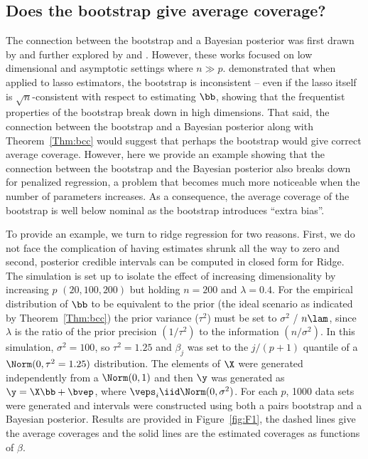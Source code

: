 \subsection{Does the bootstrap give average coverage?}
\label{Sec:boot-bias}

The connection between the bootstrap and a Bayesian posterior was first drawn by \cite{Rubin1981} and further explored by \cite{efron1982} and \cite{Lo1987}. However, these works focused on low dimensional and asymptotic settings where $n \gg p$. \cite{Chatterjee2010} demonstrated that when applied to lasso estimators, the bootstrap is inconsistent -- even if the lasso itself is $\sqrt{n}$-consistent with respect to estimating $\bb$, showing that the frequentist properties of the bootstrap break down in high dimensions. That said, the connection between the bootstrap and a Bayesian posterior along with Theorem~\ref{Thm:bcc} would suggest that perhaps the bootstrap would give correct average coverage. However, here we provide an example showing that the connection between the bootstrap and the Bayesian posterior also breaks down for penalized regression, a problem that becomes much more noticeable when the number of parameters increases. As a consequence, the average coverage of the bootstrap is well below nominal as the bootstrap introduces ``extra bias''.

To provide an example, we turn to ridge regression for two reasons. First, we do not face the complication of having estimates shrunk all the way to zero and second, posterior credible intervals can be computed in closed form for Ridge. The simulation is set up to isolate the effect of increasing dimensionality by increasing $p$ $(20, 100, 200)$ but holding $n = 200$ and $\lambda = 0.4$. For the empirical distribution of $\bb$ to be equivalent to the prior (the ideal scenario as indicated by Theorem~\ref{Thm:bcc}) the prior variance ($\tau^2$) must be set to $\sigma^2$ / $n\lam$, since $\lambda$ is the ratio of the prior precision $(1/\tau^2)$ to the information $(n / \sigma^2)$. In this simulation, $\sigma^2 = 100$, so $\tau^2 = 1.25$ and $\beta_j$ was set to the $j/(p+1)$ quantile of a $\Norm(0,\tau^2=1.25)$ distribution. The elements of $\X$ were generated independently from a $\Norm(0, 1)$ and then $\y$ was generated as $\y = \X\bb + \bvep$, where $\veps_i \iid \Norm(0, \sigma^2)$. For each $p$, 1000 data sets were generated and intervals were constructed using both a pairs bootstrap and a Bayesian posterior. Results are provided in Figure~\ref{fig:F1}, the dashed lines give the average coverages and the solid lines are the estimated coverages as functions of $\beta$.

